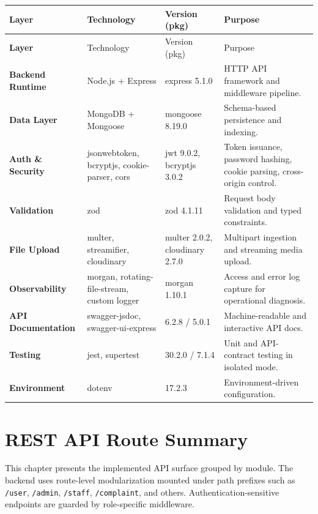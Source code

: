 \documentclass[12pt,a4paper]{report}
\renewcommand{\toprule}{\hline\hline}
\renewcommand{\midrule}{\hline}
\renewcommand{\bottomrule}{\hline\hline}
\begin{document}
\begin{longtable}{>{\bfseries}p{} p{} p{} p{}}
\toprule
\rowcolor{TableHeader}
\textcolor{TableHeaderText}{Layer} & \textcolor{TableHeaderText}{Technology} & \textcolor{TableHeaderText}{Version (pkg)} & \textcolor{TableHeaderText}{Purpose} \\
\midrule
\endfirsthead
\toprule
\rowcolor{TableHeader}
\textcolor{TableHeaderText}{Layer} & \textcolor{TableHeaderText}{Technology} & \textcolor{TableHeaderText}{Version (pkg)} & \textcolor{TableHeaderText}{Purpose} \\
\midrule
\endhead
Backend Runtime & Node.js + Express & express 5.1.0 & HTTP API framework and middleware pipeline. \\
Data Layer & MongoDB + Mongoose & mongoose 8.19.0 & Schema-based persistence and indexing. \\
Auth \& Security & jsonwebtoken, bcryptjs, cookie-parser, cors & jwt 9.0.2, bcryptjs 3.0.2 & Token issuance, password hashing, cookie parsing, cross-origin control. \\
Validation & zod & zod 4.1.11 & Request body validation and typed constraints. \\
File Upload & multer, streamifier, cloudinary & multer 2.0.2, cloudinary 2.7.0 & Multipart ingestion and streaming media upload. \\
Observability & morgan, rotating-file-stream, custom logger & morgan 1.10.1 & Access and error log capture for operational diagnosis. \\
API Documentation & swagger-jsdoc, swagger-ui-express & 6.2.8 / 5.0.1 & Machine-readable and interactive API docs. \\
Testing & jest, supertest & 30.2.0 / 7.1.4 & Unit and API-contract testing in isolated mode. \\
Environment & dotenv & 17.2.3 & Environment-driven configuration. \\
\bottomrule
\end{longtable}

\chapter{REST API Route Summary}

This chapter presents the implemented API surface grouped by module. The backend uses route-level modularization mounted under path prefixes such as \texttt{/user}, \texttt{/admin}, \texttt{/staff}, \texttt{/complaint}, and others. Authentication-sensitive endpoints are guarded by role-specific middleware.
\end{document}
